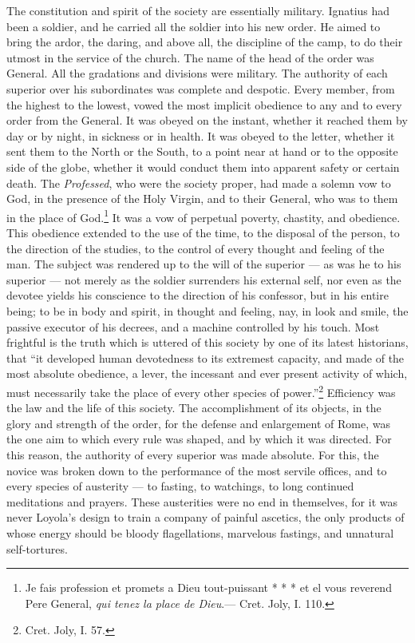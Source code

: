 \documentclass[]{book}
\let\rmarkdownfootnote\footnote%
\def\footnote{\protect\rmarkdownfootnote}
\begin{document}
The constitution and spirit of the society are essentially military. Ignatius had been a soldier, and he carried all the soldier into his new order. He aimed to bring the ardor, the daring, and above all, the discipline of the camp, to do their utmost in the service of the church. The name of the head of the order was General. All the gradations and divisions were military. The authority of each superior over his subordinates was complete and despotic. Every member, from the highest to the lowest, vowed the most implicit obedience to any and to every order from the General. It was obeyed on the instant, whether it reached them by day or by night, in sickness or in health. It was obeyed to the letter, whether it sent them to the North or the South, to a point near at hand or to the opposite side of the globe, whether it would conduct them into apparent safety or certain death. The \emph{Professed}, who were the society proper, had made a solemn vow to God, in the presence of the Holy Virgin, and to their General, who was to them in the place of God.\footnote{Je fais profession et promets a Dieu tout-puissant * * * et el vous reverend Pere General, \emph{qui tenez la place de Dieu}.--- Cret. Joly, I. 110.} It was a vow of perpetual poverty, chastity, and obedience. This obedience extended to the use of the time, to the disposal of the person, to the direction of the studies, to the control of every thought and feeling of the man. The subject was rendered up to the will of the superior --- as was he to his superior --- not merely as the soldier surrenders his external self, nor even as the devotee yields his conscience to the direction of his confessor, but in his entire being; to be in body and spirit, in thought and feeling, nay, in look and smile, the passive executor of his decrees, and a machine controlled by his touch. Most frightful is the truth which is uttered of this society by one of its latest historians, that ``it developed human devotedness to its extremest capacity, and made of the most absolute obedience, a lever, the incessant and ever present activity of which, must necessarily take the place of every other species of power.''\footnote{Cret. Joly, I. 57.} Efficiency was the law and the life of this society. The accomplishment of its objects, in the glory and strength of the order, for the defense and enlargement of Rome, was the one aim to which every rule was shaped, and by which it was directed. For this reason, the authority of every superior was made absolute. For this, the novice was broken down to the performance of the most servile offices, and to every species of austerity --- to fasting, to watchings, to long continued meditations and prayers. These austerities were no end in themselves, for it was never Loyola's design to train a company of painful ascetics, the only products of whose energy should be bloody flagellations, marvelous fastings, and unnatural self-tortures.
\end{document}
